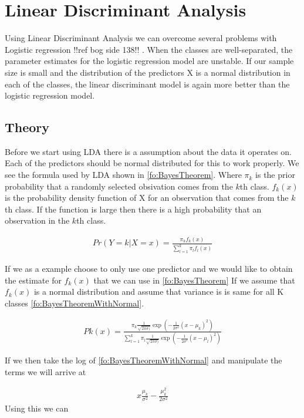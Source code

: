 \section{Linear Discriminant Analysis}
Using Linear Discriminant Analysis we can overcome several problems with Logistic regression {  !!ref bog side 138!! }. When the classes are well-separated, the parameter estimates for the
logistic regression model are unstable. If our sample size is small and the distribution of the predictors X is a normal distribution in each of the classes, the linear discriminant model is again more better than the logistic regression model.
\subsection{Theory}
Before we start using LDA there is a  assumption about the data it operates on. Each of the predictors should be normal distributed for this to work properly. We see the formula used by LDA shown in \ref{fo:BayesTheorem}. Where $\pi_k$ is the prior probability that a randomly selected obsivation comes from the $k$th class. $f_k(x)$ is the probability density function of X for an observation that comes from the $k$th class. If the function is large then there is a high probability that an observation in the $k$th class.

\begin{align}\label{fo:BayesTheorem}
Pr(Y=k|X=x) = \frac{\pi_k f_k(x)}{ \sum_{l=1}^{k}\pi_l f_l(x) }
\end{align}

If we as a example choose to only use one predictor and we would like to obtain the estimate for $f_k(x)$ that we can use in \ref{fo:BayesTheorem} If we assume that $f_k(x)$ is a normal distribution and assume that variance is is same for all K classes \ref{fo:BayesTheoremWithNormal}.

\begin{align}\label{fo:BayesTheoremWithNormal}
Pk(x) = \frac{\pi_k \frac{1}{\sqrt{2\pi\sigma)}}\exp(-\frac{1}{2\sigma^2}(x-\mu_k)^2)}{ \sum_{l=1}^{k}\pi_l \frac{1}{\sqrt{2\pi\sigma)}}\exp(-\frac{1}{2\sigma^2}(x-\mu_l)^2) }
\end{align}

If we then take the log of \ref{fo:BayesTheoremWithNormal} and manipulate the terms we will arrive at 

\begin{align}
 x\frac{\mu_k}{\sigma^2} - \frac{\mu^2_k}{2 \sigma^2}
\end{align}
Using this we can 


